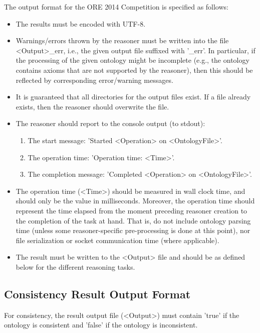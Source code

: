 \documentclass{article}
\begin{document}
The output format for the ORE 2014 Competition is specified as follows:
\begin{itemize}
\item The results must be encoded with \mbox{UTF-8}.
\item Warnings/errors thrown by the reasoner must be written into the file \mbox{\textless Output\textgreater\_err}, i.e., the given output file suffixed with '\_err'. In particular, if the processing of the given ontology might be incomplete (e.g., the ontology contains axioms that are not supported by the reasoner), then this should be reflected by corresponding error/warning messages.
\item It is guaranteed that all directories for the output files exist. If a file already exists, then the reasoner should overwrite the file.
\item The reasoner should report to the console output (to stdout):
\begin{enumerate}
\item The start message: 'Started \textless Operation\textgreater{} on \textless OntologyFile\textgreater'.
\item The operation time: 'Operation time: \textless Time\textgreater'.
\item The completion message: 'Completed \textless Operation\textgreater{} on \mbox{\textless OntologyFile\textgreater'}.
\end{enumerate}
\item The operation time (\textless Time\textgreater) should be measured in wall clock time, and should only be the value in milliseconds. 
Moreover, the operation time should represent the time elapsed from the moment preceding reasoner creation to the completion of the task at hand. 
That is, do not include ontology parsing time (unless some reasoner-specific pre-processing is done at this point), nor file serialization or socket communication time (where applicable).
\item The result must be written to the \textless Output\textgreater{} file and should be as defined below for the different reasoning tasks.
\end{itemize}

\subsection{Consistency Result Output Format}
For consistency, the result output file (\textless Output\textgreater{}) must contain 'true' if the ontology is consistent and 'false' if the ontology is inconsistent.
\end{document}
